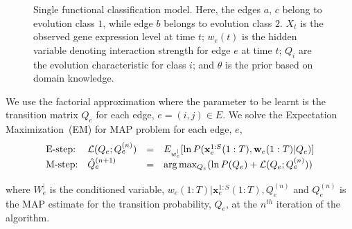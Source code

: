 \documentclass{bioinfo}
\begin{document}
\begin{methods}
\begin{figure}[h]
  \centering
  \caption{Single functional classification model. Here, the
    edges $a, \,c$ belong to evolution class $1$, while edge $b$
    belongs to evolution class $2$. $X_{t}$ is the observed gene
    expression level at time $t$; $w_{e}(t)$ is the hidden variable
    denoting interaction strength for edge $e$ at time $t$; $Q_{i}$
    are the evolution characteristic for class $i$; and $\theta$ is
    the prior based on domain knowledge.}
  \label{fig:factorial}
\end{figure}

We use the factorial approximation where the parameter to be learnt is
the transition matrix $Q_{e}$ for each edge, $e = (i, j) \in E$.  We solve the Expectation
Maximization~(EM)\citep{Dempster77em} for MAP problem for each edge,
$e$,
\begin{equation}
  \label{eq:q-edge_em_map}
  \begin{array}[h]{llll}
  \textrm{E-step:} & {\mathcal L}(Q_{e}; Q_{e}^{(n)}) &=&
  E_{w_{e}^{|} }  [ \ln P(\mathbf{x}_{e}^{1:S}(1:T),
  \mathbf{w}_{e}({1:T}) | Q_{e})] \\
\vspace{2 mm}
  \textrm{M-step:} & \hat{Q}_{e}^{(n+1)} &=& \arg\max_{Q_{e}} (\ln P(Q_{e}) +
  {\mathcal L}(Q_{e}; Q_{e}^{(n)} ) ) 
  \end{array}
\end{equation}
where $W^{|}_{e}$ is the conditioned variable, $w_{e}(1:T)|
\mathbf{x}_{e}^{1:S}(1:T), Q_{e}^{(n)}$ and $Q_{e}^{(n)}$ is the
MAP estimate for the transition probability, $Q_{e}$, at the $n^{th}$
iteration of the algorithm. 



\end{methods}
\end{document}
